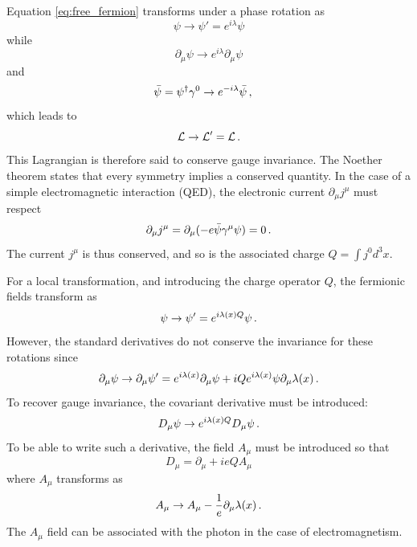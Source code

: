 Equation \ref{eq:free_fermion} transforms under a phase rotation as
\begin{equation}
    \psi \rightarrow \psi' = e^{i\lambda}\psi
\end{equation}
while
\begin{equation}
    \partial_{\mu}\psi \rightarrow e^{i\lambda}\partial_{\mu}\psi
\end{equation}
and
\begin{equation}
    \Bar{\psi} = \psi^{\dagger}\gamma^{0} \rightarrow e^{-i\lambda}\Bar{\psi} \msep
\end{equation}
which leads to 
\begin{equation}
    \Lagr \rightarrow \Lagr' = \Lagr \mend
\end{equation}
This Lagrangian is therefore said to conserve gauge invariance. The Noether theorem states that every symmetry implies a conserved quantity. In the case of a simple electromagnetic interaction (QED), the electronic current $\partial_{\mu}j^{\mu}$ must respect
\begin{equation}
    \partial_{\mu}j^{\mu} = \partial_{\mu}(-e\Bar{\psi}\gamma^{\mu}\psi) = 0 \mend
\end{equation}
The current $j^{\mu}$ is thus conserved, and so is the associated charge $Q = \int j^{0}d^3 x$. \newline

For a local transformation, and introducing the charge operator $Q$, the fermionic fields transform as
\begin{equation}
    \psi \rightarrow \psi' = e^{i\lambda(x)Q}\psi \mend
\end{equation}
However, the standard derivatives do not conserve the invariance for these rotations since
\begin{equation}
    \partial_{\mu}\psi \rightarrow \partial_{\mu}\psi' = e^{i\lambda(x)}\partial_{\mu}\psi + iQe^{i\lambda(x)}\psi\partial_{\mu}\lambda(x) \mend
\end{equation}
To recover gauge invariance, the covariant derivative must be introduced:
\begin{equation}
    D_{\mu}\psi \rightarrow e^{i\lambda(x)Q}D_{\mu}\psi \mend
\end{equation}
To be able to write such a derivative, the field $A_{\mu}$ must be introduced so that
\begin{equation}
    D_{\mu} = \partial_{\mu} + ieQA_{\mu}
\end{equation}
where $A_{\mu}$ transforms as
\begin{equation}
    A_{\mu} \rightarrow A_{\mu} - \frac{1}{e}\partial_{\mu}\lambda(x) \mend
\end{equation}
The $A_{\mu}$ field can be associated with the photon in the case of electromagnetism. \newline

